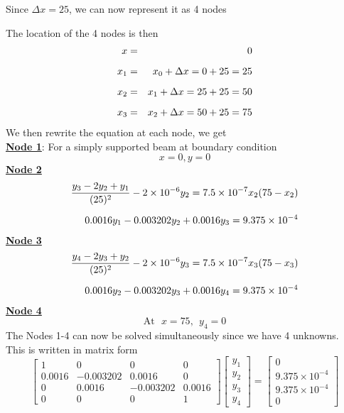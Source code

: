 \documentclass[12pt]{report}
\newcommand{\ubt}[1]{\textbf{\underline{#1}}}
\newcommand{\sps}{\\[0.2cm]}
\begin{document}
	Since $\Delta x = 25$, we can now represent it as 4 nodes
	\begin{center}
	\end{center}
	The location of the 4 nodes is then
	\begin{eqnarray}
		x & = & 0\notag\sps
		x_1 & = & x_0 + \Delta x = 0 + 25 = 25\notag\sps
		x_2 & = & x_1 + \Delta x = 25 + 25 = 50\notag\sps
		x_3 & = & x_2 + \Delta x = 50 + 25 = 75\notag
	\end{eqnarray}
	We then rewrite the equation at each node, we get\sps
	\ubt{Node 1}: For a simply supported beam at boundary condition
	\begin{equation*}
		x = 0, y = 0
	\end{equation*}
	\ubt{Node 2}
	\begin{eqnarray}
		\frac{y_3 - 2y_2 + y_1}{(25)^2} -2 \times 10^{-6}y_2 = 7.5 \times 10^{-7}x_2(75-x_2)\notag\sps
		0.0016y_1 - 0.003202y_2 + 0.0016y_3 = 9.375 \times 10^{-4}\notag
	\end{eqnarray}
	\ubt{Node 3}
	\begin{eqnarray}
		\frac{y_4 - 2y_3 + y_2}{(25)^2} -2 \times 10^{-6}y_3 = 7.5 \times 10^{-7}x_3(75-x_3)\notag\sps
		0.0016y_2 - 0.003202y_3 + 0.0016y_4 = 9.375 \times 10^{-4}\notag
	\end{eqnarray}
	\ubt{Node 4}
	\begin{equation*}
	\text{At}~~~x = 75, ~~ y_4 = 0
	\end{equation*}
	The Nodes 1-4 can now be solved simultaneously since we have 4 unknowns.\\
	This is written in matrix form
	\begin{equation*}
		\begin{bmatrix}
			1 & 0 & 0 & 0\\
			0.0016 & -0.003202 & 0.0016 & 0\\
			0 & 0.0016 & -0.003202 & 0.0016\\
			0 & 0 & 0 & 1
		\end{bmatrix}
		\begin{bmatrix}
			y_1\\
			y_2\\
			y_3\\
			y_4
		\end{bmatrix}
		=
		\begin{bmatrix}
			0\\
			9.375 \times 10^{-4}\\
			9.375 \times 10^{-4}\\
			0
		\end{bmatrix}
	\end{equation*}
\end{document}
